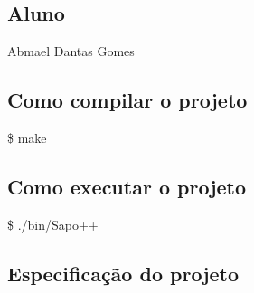 \subsection*{Aluno}

Abmael Dantas Gomes

\subsection*{Como compilar o projeto}

\$ make

\subsection*{Como executar o projeto}

\$ ./bin/\+Sapo++

\subsection*{Especificação do projeto}


